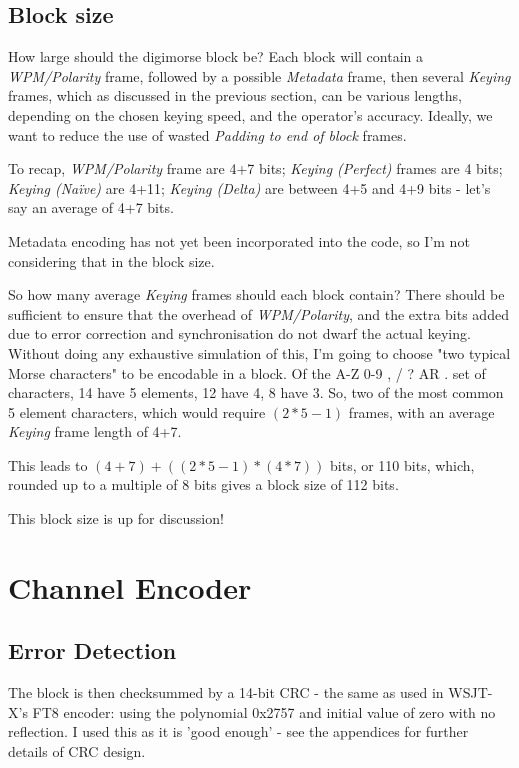 \documentclass[a4paper]{tufte-handout}
\begin{document}
\subsection{Block size}
\label{section:block-size}

How large should the digimorse block be? Each block will contain a \emph{WPM/Polarity} frame, followed by a possible \emph{Metadata} frame, then several \emph{Keying} frames, which as discussed in the previous section, can be various lengths, depending on the chosen keying speed, and the operator's accuracy. Ideally, we want to reduce the use of wasted 
	\emph{Padding to end of block} frames.

To recap, \emph{WPM/Polarity} frame are 4+7 bits; \emph{Keying (Perfect)} frames are 4 bits; \emph{Keying (Naïve)} are 4+11; \emph{Keying (Delta)} are between 4+5 and 4+9 bits - let's say an average of 4+7 bits. 

Metadata encoding has not yet been incorporated into the code, so I'm not considering that in the block size.

So how many average \emph{Keying} frames should each block contain? There should be sufficient to ensure that the overhead of \emph{WPM/Polarity}, and the extra bits added due to error correction and synchronisation do not dwarf the actual keying. Without doing any exhaustive simulation of this, I'm going to choose "two typical Morse characters" to be encodable in a block. Of the A-Z 0-9 , / ? AR . set of characters, 14 have 5 elements, 12 have 4, 8 have 3. So, two of the most common 5 element characters, which would require $(2*5 - 1)$ frames, with an average \emph{Keying} frame length of 4+7.

This leads to $(4+7) + ((2*5 - 1) * (4*7))$ bits, or 110 bits, which, rounded up to a multiple of 8 bits gives a block size of 112 bits.
    
This block size is up for discussion!
    
\section{Channel Encoder}
\subsection{Error Detection}

The block is then checksummed by a 14-bit CRC - the same as used in WSJT-X's FT8 encoder: using the polynomial 0x2757
and initial value of zero with no reflection\cite{Williams1993}. I used this as it is 'good enough' - see the appendices
for further details of CRC design.
\end{document}
